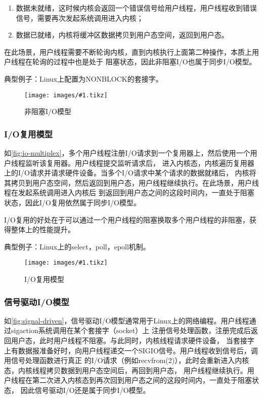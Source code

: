 \documentclass[supercite]{HustGraduPaper}
\newcommand{\cfig}[3]{
  \begin{figure}[htb]
    \centering
    \texttt{[image: images/\#1.tikz]}
    \caption{#3}
    \label{fig:#1}
  \end{figure}
}
\newcommand{\rfig}[1]{\autoref{fig:#1}}
\theoremstyle{definition}
\begin{document}
\begin{enumerate}[label={(\arabic*)}]
  \item 数据未就绪，这时候内核会返回一个错误信号给用户线程，用户线程收到错误信号，需要再次发起系统调用进入内核；
  \item 数据已就绪，内核将缓冲区数据拷贝到用户态空间，返回到用户态。
\end{enumerate}

在此场景，用户线程需要不断轮询内核，直到内核执行上面第二种操作，本质上用户线程在轮询的过程中也是处于
阻塞状态，因此非阻塞I/O也属于同步I/O模型。\par

典型例子：Linux上配置为NONBLOCK的套接字。\par

\cfig{nonblock-io}{0.5}{非阻塞I/O模型}

\subsubsection{I/O复用模型}
如\rfig{io-multiplex}，多个用户线程注册I/O请求到一个复用器上，然后使用一个用户线程监听该复用器。用户线程提交监听请求后，
进入内核态，内核遍历复用器上的I/O请求并请求硬件设备。当多个I/O请求中某个请求的数据就绪后，
内核将其拷贝到用户态空间，然后返回到用户态，用户线程继续执行。在此场景，用户线程在发起系统调用进入内核后
到返回到用户态之间的这段时间内，一直处于阻塞状态，因此I/O复用依然属于同步I/O模型。\par

I/O复用的好处在于可以通过一个用户线程的阻塞换取多个用户线程的非阻塞，获得整体上的性能提升。\par

典型例子：Linux上的select，poll，epoll机制。\par

\cfig{io-multiplex}{0.7}{I/O复用模型}

\subsubsection{信号驱动I/O模型}
如\rfig{signal-driven}，信号驱动I/O模型通常用于Linux上的网络编程。用户线程通过sigaction系统调用在某个套接字（socket）上
注册信号处理函数，注册完成后返回用户态，此时用户线程不阻塞。与此同时，内核线程请求硬件设备，
当套接字上有数据报准备好时，向用户线程递交一个SIGIO信号。用户线程收到信号后，调用信号处理函数进行真正
的I/O请求（例如recvfrom(2)），此时会重新进入内核态，内核线程拷贝数据到用户态空间后，再回到用户态，
用户线程继续执行。用户线程在第二次进入内核态到再次回到用户态之间的这段时间内，一直处于阻塞状态，
因此信号驱动I/O还是属于同步I/O模型。\par
\end{document}
